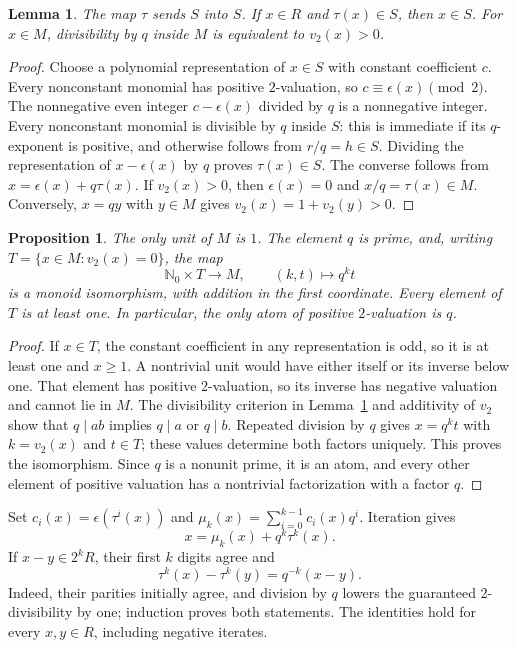\documentclass[11pt]{article}
\newtheorem{proposition}[theorem]{Proposition}
\newtheorem{lemma}[theorem]{Lemma}
\theoremstyle{definition}
\newcommand{\NN}{\mathbb N}
\begin{document}
\begin{lemma}\label{lem:tau}
The map $\tau$ sends $S$ into $S$. If $x\in R$ and $\tau(x)\in S$,
then $x\in S$. For $x\in M$, divisibility by $q$ inside $M$ is equivalent
to $v_2(x)>0$.
\end{lemma}
\begin{proof}
Choose a polynomial representation of $x\in S$ with constant coefficient
$c$. Every nonconstant monomial has positive $2$-valuation, so
$c\equiv\epsilon(x)\pmod2$. The nonnegative even integer
$c-\epsilon(x)$ divided by $q$ is a nonnegative integer. Every
nonconstant monomial is divisible by $q$ inside $S$: this is immediate
if its $q$-exponent is positive, and otherwise follows from $r/q=h\in S$.
Dividing the representation of $x-\epsilon(x)$ by $q$ proves
$\tau(x)\in S$. The converse follows from
$x=\epsilon(x)+q\tau(x)$. If $v_2(x)>0$, then $\epsilon(x)=0$ and
$x/q=\tau(x)\in M$. Conversely, $x=qy$ with $y\in M$ gives
$v_2(x)=1+v_2(y)>0$.
\end{proof}

\begin{proposition}\label{prop:split}
The only unit of $M$ is $1$. The element $q$ is prime, and, writing
$T=\{x\in M:v_2(x)=0\}$, the map
\[
 \NN_0\times T\longrightarrow M,\qquad (k,t)\longmapsto q^kt
\]
is a monoid isomorphism, with addition in the first coordinate.
Every element of $T$ is at least one. In particular, the only atom
of positive $2$-valuation is $q$.
\end{proposition}
\begin{proof}
If $x\in T$, the constant coefficient in any representation is odd,
so it is at least one and $x\ge1$. A nontrivial unit would have either
itself or its inverse below one. That element has positive $2$-valuation,
so its inverse has negative valuation and cannot lie in $M$.
The divisibility criterion in Lemma~\ref{lem:tau} and additivity of
$v_2$ show that $q\mid ab$ implies $q\mid a$ or $q\mid b$.
Repeated division by $q$ gives $x=q^kt$ with $k=v_2(x)$ and $t\in T$;
these values determine both factors uniquely. This proves the
isomorphism. Since $q$ is a nonunit prime, it is an atom, and every
other element of positive valuation has a nontrivial factorization
with a factor $q$.
\end{proof}

Set $c_i(x)=\epsilon(\tau^i(x))$ and
$\mu_k(x)=\sum_{i=0}^{k-1}c_i(x)q^i$. Iteration gives
\begin{equation}\label{eq:prefix}
 x=\mu_k(x)+q^k\tau^k(x).
\end{equation}
If $x-y\in2^kR$, their first $k$ digits agree and
\begin{equation}\label{eq:congruence}
 \tau^k(x)-\tau^k(y)=q^{-k}(x-y).
\end{equation}
Indeed, their parities initially agree, and division by $q$ lowers
the guaranteed $2$-divisibility by one; induction proves both statements.
The identities hold for every $x,y\in R$, including negative iterates.
\end{document}
